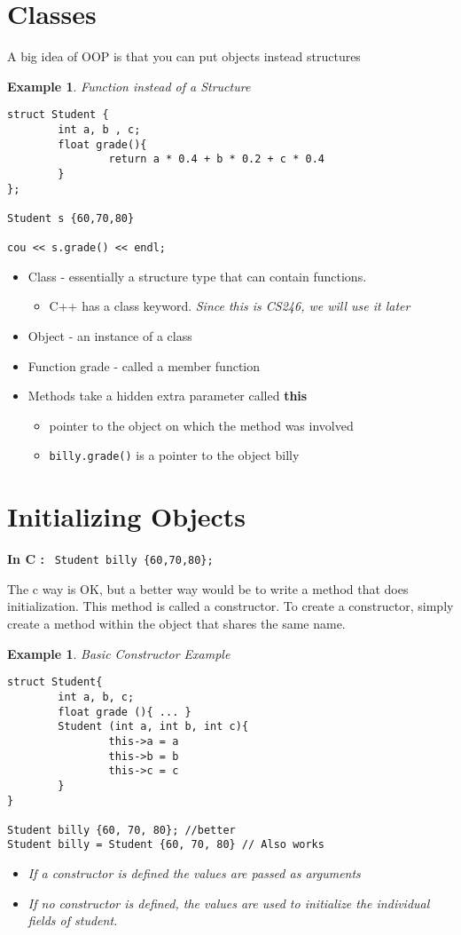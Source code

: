 \documentclass{article}
\newtheorem{ex}[theorem]{Example}
\begin{document}
\section{Classes}
A big idea of OOP is that you can put objects instead structures
\newpage 
\begin{ex} Function instead of a Structure 
\begin{lstlisting}
struct Student {
		int a, b , c;
		float grade(){
				return a * 0.4 + b * 0.2 + c * 0.4
		}
};

Student s {60,70,80}

cou << s.grade() << endl;
\end{lstlisting}
\end{ex}

\begin{itemize}
\item Class - essentially a structure type that can contain functions. 
\begin{itemize}
\item C++ has a class keyword. \textit{Since this is CS246, we will use it later}
\end{itemize}
\item Object - an instance of a class
\item Function grade - called a member function 
\item Methods take a hidden extra parameter called \textbf{this}
\begin{itemize}
\item pointer to the object on which the method was involved
\item \verb|billy.grade()| is a pointer to the object billy 
\end{itemize}
\end{itemize}

\section{Initializing Objects}

\textbf{In C : } \verb| Student billy {60,70,80};|

The c way is OK, but a better way would be to write a method that does initialization. This method is called a constructor. To create a constructor, simply create a method within the object that shares the same name.

\begin{ex} Basic Constructor Example 
\begin{lstlisting}
struct Student{
		int a, b, c;
		float grade (){ ... }
		Student (int a, int b, int c){
				this->a = a
				this->b = b
				this->c = c
		}
}

Student billy {60, 70, 80}; //better 
Student billy = Student {60, 70, 80} // Also works
\end{lstlisting}

\begin{itemize}
\item If a constructor is defined the values are passed as arguments 
\item If no constructor is defined, the values are used to initialize the individual fields of student.
\end{itemize}
\end{ex}
\end{document}
